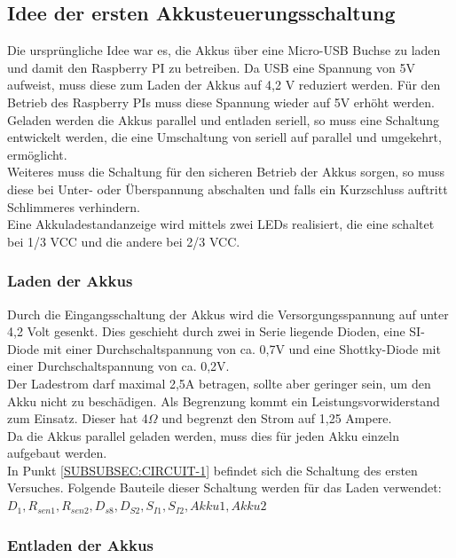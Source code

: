 \documentclass[12pt,a4paper]{article}
\begin{document}
\subsection{Idee der ersten Akkusteuerungsschaltung}
\label{SUBSEC:AKKUSTEUR1}

Die ursprüngliche Idee war es, die Akkus über eine Micro-USB Buchse zu laden und damit den Raspberry PI zu betreiben. Da USB eine Spannung von 5V aufweist, muss diese zum Laden der Akkus auf 4,2 V reduziert werden. Für den Betrieb des Raspberry PIs muss diese Spannung wieder auf 5V erhöht werden. \\
Geladen werden die Akkus parallel und entladen seriell, so muss eine Schaltung entwickelt werden, die eine Umschaltung von seriell auf parallel und umgekehrt, ermöglicht. \\
Weiteres muss die Schaltung für den sicheren Betrieb der Akkus sorgen, so muss diese bei Unter- oder Überspannung abschalten und falls ein Kurzschluss auftritt Schlimmeres verhindern. \\
Eine Akkuladestandanzeige wird mittels zwei LEDs realisiert, die eine schaltet bei 1/3 VCC und die andere bei 2/3 VCC. 

\subsubsection{Laden der Akkus}
\label{SUBSUBSEC:AKKULOAD1}

Durch die Eingangsschaltung der Akkus wird die Versorgungsspannung auf unter 4,2 Volt gesenkt. Dies geschieht durch zwei in Serie liegende Dioden, eine SI-Diode mit einer Durchschaltspannung von ca. 0,7V und eine Shottky-Diode mit einer Durchschaltspannung von ca. 0,2V. \\
Der Ladestrom darf maximal 2,5A betragen, sollte aber geringer sein, um den Akku nicht zu beschädigen. Als Begrenzung kommt ein Leistungsvorwiderstand zum Einsatz. Dieser hat 4$\Omega$ und begrenzt den Strom auf 1,25 Ampere. \\
Da die Akkus parallel geladen werden, muss dies für jeden Akku einzeln aufgebaut werden. \\
In Punkt \ref{SUBSUBSEC:CIRCUIT-1} befindet sich die Schaltung des ersten Versuches. Folgende Bauteile dieser Schaltung werden für das Laden verwendet:\\
 $D_1,R_{sen1},R_{sen2},D_{s8},D_{S2},S_{I1},S_{I2}, Akku1, Akku2$ \\


\subsubsection{Entladen der Akkus}
\label{SUBSUBSEC:AKKUENTLOAD1}
\end{document}
